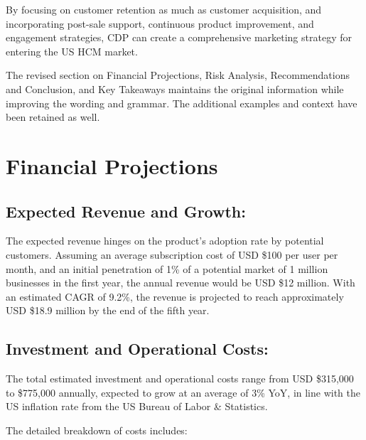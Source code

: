 \documentclass[
  a4paper,
]{book}
\begin{document}
By focusing on customer retention as much as customer acquisition, and
incorporating post-sale support, continuous product improvement, and
engagement strategies, CDP can create a comprehensive marketing strategy
for entering the US HCM market.

The revised section on Financial Projections, Risk Analysis,
Recommendations and Conclusion, and Key Takeaways maintains the original
information while improving the wording and grammar. The additional
examples and context have been retained as well.

\hypertarget{financial-projections}{%
\section{Financial Projections}\label{financial-projections}}

\hypertarget{expected-revenue-and-growth}{%
\subsection{Expected Revenue and
Growth:}\label{expected-revenue-and-growth}}

The expected revenue hinges on the product's adoption rate by potential
customers. Assuming an average subscription cost of USD \$100 per user
per month, and an initial penetration of 1\% of a potential market of 1
million businesses in the first year, the annual revenue would be USD
\$12 million. With an estimated CAGR of 9.2\%, the revenue is projected
to reach approximately USD \$18.9 million by the end of the fifth year.

\hypertarget{investment-and-operational-costs}{%
\subsection{Investment and Operational
Costs:}\label{investment-and-operational-costs}}

The total estimated investment and operational costs range from USD
\$315,000 to \$775,000 annually, expected to grow at an average of 3\%
YoY, in line with the US inflation rate from the US Bureau of Labor \&
Statistics.

The detailed breakdown of costs includes:
\end{document}
